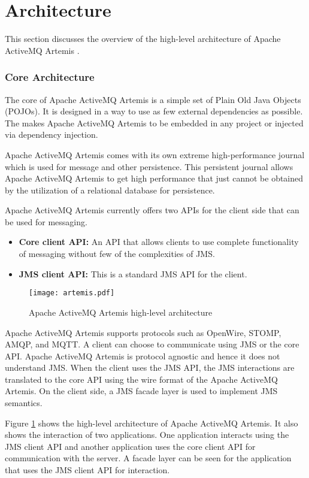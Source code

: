 \section{Architecture}

This section discusses the overview of the high-level architecture of Apache ActiveMQ Artemis \parencite{artemis_architecture}.

\subsubsection{Core Architecture}

The core of Apache ActiveMQ Artemis is a simple set of Plain Old Java Objects (POJOs). It is designed in a way to use as few external dependencies as possible. The makes Apache ActiveMQ Artemis to be embedded in any project or injected via dependency injection.

Apache ActiveMQ Artemis comes with its own extreme high-performance journal which is used for message and other persistence. This persistent journal allows Apache ActiveMQ Artemis to get high performance that just cannot be obtained by the utilization of a relational database for persistence.

Apache ActiveMQ Artemis currently offers two APIs for the client side that can be used for messaging.

\begin{itemize}
    \item \textbf{Core client API:}
          An API that allows clients to use complete functionality of messaging without few of the complexities of JMS.

    \item \textbf{JMS client API:}
          This is a standard JMS API for the client.

\end{itemize}

\makeatletter
\setlength{\intextsep}{20pt}
\makeatother

\begin{figure}[h!]
\centering
\texttt{[image: artemis.pdf]}
\caption{Apache ActiveMQ Artemis high-level architecture}\label{figures:artemis}
\end{figure}

Apache ActiveMQ Artemis supports protocols such as OpenWire, STOMP, AMQP, and MQTT. A client can choose to communicate using JMS or the core API. Apache ActiveMQ Artemis is protocol agnostic and hence it does not understand JMS. When the client uses the JMS API, the JMS interactions are translated to the core API using the wire format of the Apache ActiveMQ Artemis. On the client side, a JMS facade layer is used to implement JMS semantics.

Figure \ref{figures:artemis} shows the high-level architecture of Apache ActiveMQ Artemis. It also shows the interaction of two applications. One application interacts using the JMS client API and another application uses the core client API for communication with the server. A facade layer can be seen for the application that uses the JMS client API for interaction.